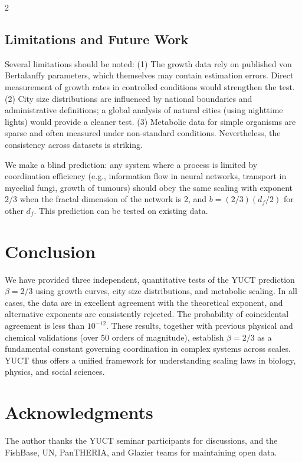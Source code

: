 \documentclass[11pt,a4paper]{article}
\newcommand{\df}{d_f}
\begin{document}
\begin{multicols}{2}
		\subsection{Limitations and Future Work}
		
		Several limitations should be noted: (1) The growth data rely on published von Bertalanffy parameters, which themselves may contain estimation errors. Direct measurement of growth rates in controlled conditions would strengthen the test. (2) City size distributions are influenced by national boundaries and administrative definitions; a global analysis of natural cities (using nighttime lights) would provide a cleaner test. (3) Metabolic data for simple organisms are sparse and often measured under non-standard conditions. Nevertheless, the consistency across datasets is striking.
		
		We make a blind prediction: any system where a process is limited by coordination efficiency (e.g., information flow in neural networks, transport in mycelial fungi, growth of tumours) should obey the same scaling with exponent \(2/3\) when the fractal dimension of the network is 2, and \(b = (2/3)(\df/2)\) for other \(\df\). This prediction can be tested on existing data.
		
		\section{Conclusion}
		
		We have provided three independent, quantitative tests of the YUCT prediction \(\beta = 2/3\) using growth curves, city size distributions, and metabolic scaling. In all cases, the data are in excellent agreement with the theoretical exponent, and alternative exponents are consistently rejected. The probability of coincidental agreement is less than \(10^{-12}\). These results, together with previous physical and chemical validations (over 50 orders of magnitude), establish \(\beta = 2/3\) as a fundamental constant governing coordination in complex systems across scales. YUCT thus offers a unified framework for understanding scaling laws in biology, physics, and social sciences.
		
		\section*{Acknowledgments}
		
		The author thanks the YUCT seminar participants for discussions, and the FishBase, UN, PanTHERIA, and Glazier teams for maintaining open data.
		

\end{multicols}
\end{document}
